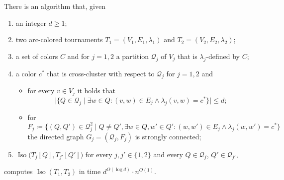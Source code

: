 \documentclass{theoretics}
\newcommand{\CQ}{{\mathcal Q}}
\newcommand{\bigmid}{\;\big|\;}
\DeclareMathOperator{\Iso}{Iso}
\begin{document}
\begin{lemma}
 \label{lem:lift-isomorphisms}
 There is an algorithm that, given
 \begin{enumerate}[label = (\Alph*)]
  \item\label{item:lift-isomorphisms-1} an integer $d \geq 1$;
  \item\label{item:lift-isomorphisms-2} two arc-colored tournaments $T_1=(V_1,E_1,\lambda_1)$ and $T_2=(V_2,E_2,\lambda_2)$;
  \item\label{item:lift-isomorphisms-3} a set of colors $C$ and for $j=1,2$ a partition $\CQ_j$ of $V_j$ that is $\lambda_j$-defined by $C$;
  \item\label{item:lift-isomorphisms-4} a color $c^*$ that is cross-cluster with respect to $\CQ_j$ for $j=1,2$ and
   \begin{itemize}
    \item for every $v \in V_j$ it holds that
     \[\big|\big\{Q \in \CQ_j \bigmid \exists w \in Q\colon (v,w) \in E_j \wedge \lambda_j(v,w) = c^*\big\}\big| \leq d;\]
    \item for
     \[F_j \coloneqq \big\{(Q,Q')\in\CQ_j^2 \bigmid Q\neq Q', \exists w \in Q,w' \in Q'\colon (w,w') \in E_j \wedge \lambda_j(w,w') = c^*\big\}\]
     the directed graph $G_j = (\CQ_j,F_j)$ is strongly connected;
   \end{itemize}
  \item\label{item:lift-isomorphisms-5} $\Iso\big(T_j[Q],T_{j'}[Q']\big)$ for every $j,j' \in \{1,2\}$ and every $Q \in \CQ_j$, $Q' \in \CQ_{j'}$,
 \end{enumerate}
 computes $\Iso(T_1,T_2)$ in time $d^{O(\log d)} \cdot n^{O(1)}$.
\end{lemma}
\end{document}
